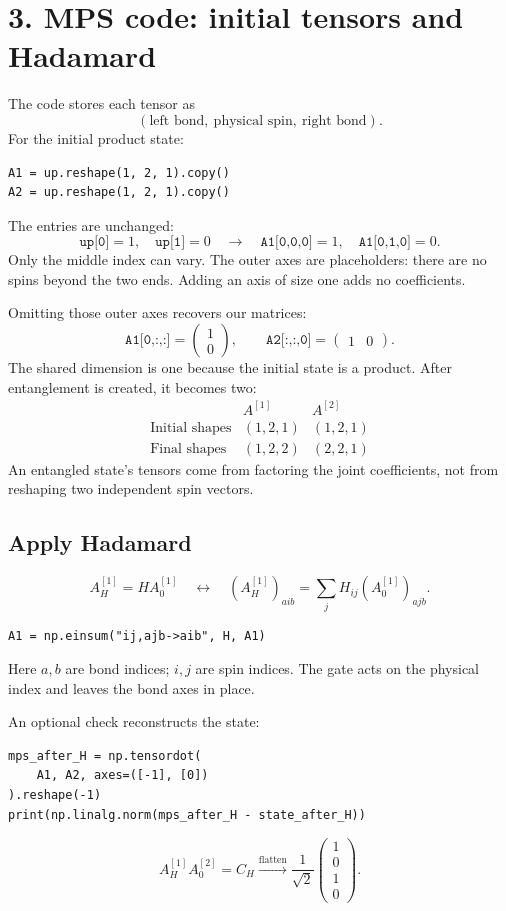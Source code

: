 \documentclass[11pt]{article}
\newcommand{\vfour}[4]{\begin{pmatrix}#1\\#2\\#3\\#4\end{pmatrix}}
\begin{document}
\newpage
\section*{3. MPS code: initial tensors and Hadamard}
The code stores each tensor as
\[
(\text{left bond},\ \text{physical spin},\ \text{right bond}).
\]
For the initial product state:
\begin{lstlisting}
A1 = up.reshape(1, 2, 1).copy()
A2 = up.reshape(1, 2, 1).copy()
\end{lstlisting}
The entries are unchanged:
\[
\texttt{up[0]}=1,\quad\texttt{up[1]}=0
\quad\longrightarrow\quad
\texttt{A1[0,0,0]}=1,\quad\texttt{A1[0,1,0]}=0.
\]
Only the middle index can vary. The outer axes are placeholders: there are no spins beyond the two ends. Adding an axis of size one adds no coefficients.

Omitting those outer axes recovers our matrices:
\[
\texttt{A1[0,:,:]}=\begin{pmatrix}1\\0\end{pmatrix},
\qquad
\texttt{A2[:,:,0]}=\begin{pmatrix}1&0\end{pmatrix}.
\]
The shared dimension is one because the initial state is a product. After entanglement is created, it becomes two:
\[
\begin{array}{c|cc}
 & A^{[1]} & A^{[2]}\\\hline
\text{Initial shapes} &(1,2,1)&(1,2,1)\\
\text{Final shapes} &(1,2,2)&(2,2,1)
\end{array}
\]
An entangled state's tensors come from factoring the joint coefficients, not from reshaping two independent spin vectors.

\subsection*{Apply Hadamard}
\[
A_H^{[1]}=HA_0^{[1]}
\quad\longleftrightarrow\quad
(A_H^{[1]})_{aib}=\sum_j H_{ij}(A_0^{[1]})_{ajb}.
\]
\begin{lstlisting}
A1 = np.einsum("ij,ajb->aib", H, A1)
\end{lstlisting}
Here $a,b$ are bond indices; $i,j$ are spin indices. The gate acts on the physical index and leaves the bond axes in place.

An optional check reconstructs the state:
\begin{lstlisting}
mps_after_H = np.tensordot(
    A1, A2, axes=([-1], [0])
).reshape(-1)
print(np.linalg.norm(mps_after_H - state_after_H))
\end{lstlisting}
\[
A_H^{[1]}A_0^{[2]}=C_H
\xrightarrow{\text{flatten}}
\frac1{\sqrt2}\vfour{1}{0}{1}{0}.
\]
\end{document}
